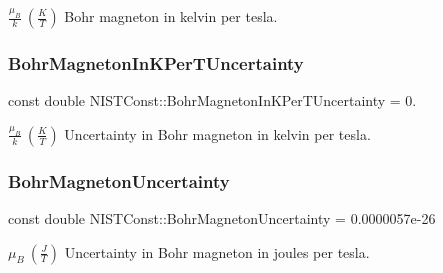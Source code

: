 $\frac{\mu_B}{k} \ (\frac{K}{T})$ Bohr magneton in kelvin per tesla. \mbox{\label{group___bohr_magneton_ga25a3b7882df7b01e29f7d0ec090a6f91}} 
\subsubsection{\texorpdfstring{Bohr\+Magneton\+In\+K\+Per\+T\+Uncertainty}{BohrMagnetonInKPerTUncertainty}}
{\footnotesize\ttfamily const double N\+I\+S\+T\+Const\+::\+Bohr\+Magneton\+In\+K\+Per\+T\+Uncertainty = 0.}

$\frac{\mu_B}{k} \ (\frac{K}{T})$ Uncertainty in Bohr magneton in kelvin per tesla. \mbox{\label{group___bohr_magneton_gaf2591aab0321fec9056cc1a8479cb05b}} 
\subsubsection{\texorpdfstring{Bohr\+Magneton\+Uncertainty}{BohrMagnetonUncertainty}}
{\footnotesize\ttfamily const double N\+I\+S\+T\+Const\+::\+Bohr\+Magneton\+Uncertainty = 0.\+0000057e-\/26}

$\mu_B \ (\frac{J}{T})$ Uncertainty in Bohr magneton in joules per tesla. 